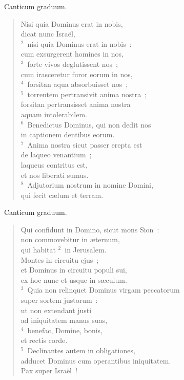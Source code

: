 ~\lettrine[lines=10,image=true,loversize=0.05,lraise=-0.03]{C}{}anticum graduum. \begin{flushleft}\begin{verse}\vspace{6pt}Nisi quia Dominus erat in nobis,\\ dicat nunc Isra\"el,\\
${}^{2}$~nisi quia Dominus erat in nobis~:\\ cum exsurgerent homines in nos,\\
${}^{3}$~forte vivos deglutissent nos~;\\ cum irasceretur furor eorum in nos,\\
${}^{4}$~forsitan aqua absorbuisset nos~;\\
${}^{5}$~torrentem pertransivit anima nostra~;\\ forsitan pertransisset anima nostra\\ aquam intolerabilem.\\
${}^{6}$~Benedictus Dominus, qui non dedit nos\\ in captionem dentibus eorum.\\
${}^{7}$~Anima nostra sicut passer erepta est\\ de laqueo venantium~;\\ laqueus contritus est,\\ et nos liberati sumus.\\
${}^{8}$~Adjutorium nostrum in nomine Domini,\\ qui fecit c\ae lum et terram.\end{verse}\end{flushleft}


~\lettrine[lines=10,image=true,loversize=0.05,lraise=-0.03]{C}{}anticum graduum. \begin{flushleft}\begin{verse}\vspace{6pt}Qui confidunt in Domino, sicut mons Sion~:\\ non commovebitur in \ae ternum,\\ qui habitat
${}^{2}$~in Jerusalem.\\ Montes in circuitu ejus~;\\ et Dominus in circuitu populi sui,\\ ex hoc nunc et usque in s\ae culum.\\
${}^{3}$~Quia non relinquet Dominus virgam peccatorum\\ super sortem justorum~:\\ ut non extendant justi\\ ad iniquitatem manus suas,\\
${}^{4}$~benefac, Domine, bonis,\\ et rectis corde.\\
${}^{5}$~Declinantes autem in obligationes,\\ adducet Dominus cum operantibus iniquitatem.\\ Pax super Isra\"el~!\end{verse}\end{flushleft}


